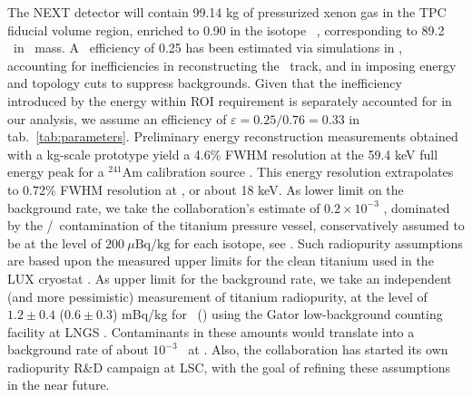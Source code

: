 The NEXT detector will contain 99.14 kg of pressurized xenon gas in the TPC fiducial volume region, enriched to 0.90 in the isotope \XE\ \cite{NEXT:2011eyk}, corresponding to 89.2 \kgbb\ in \bb\ mass. A \bbonu\ efficiency of 0.25 has been estimated via simulations in \cite{NEXT:2011eyk}, accounting for inefficiencies in reconstructing the \bb\ track, and in imposing energy and topology cuts to suppress backgrounds. Given that the inefficiency introduced by the energy within ROI requirement is separately accounted for in our analysis, we assume an efficiency of $\varepsilon =0.25/0.76=0.33$ in tab.~\ref{tab:parameters}. Preliminary energy reconstruction measurements obtained with a kg-scale prototype yield a 4.6\% FWHM resolution at the 59.4 keV full energy peak for a $^{241}$Am calibration source \cite{NEXT:2011eyk}. This energy resolution extrapolates to 0.72\% FWHM resolution at \Qbb, or about 18 keV. As lower limit on the background rate, we take the collaboration's estimate of $0.2\times 10^{-3}$ \ckkbby, dominated by the \URANIUM/\THORIUM\ contamination of the titanium pressure vessel, conservatively assumed to be at the level of $200\ \mu\text{Bq/kg}$ for each isotope, see \cite{NEXT:2011eyk}. Such radiopurity assumptions are based upon the measured upper limits for the clean titanium used in the LUX cryostat \cite{Hall:2010zz}. As upper limit for the background rate, we take an independent (and more pessimistic) measurement of titanium radiopurity, at the level of $1.2\pm 0.4$ ($0.6\pm 0.3$) mBq/kg for \URANIUM\ (\THORIUM) using the Gator low-background counting facility at LNGS \cite{Baudis:2012bc,Baudis:2011am}. Contaminants in these amounts would translate into a background rate of about $10^{-3}$ \ckkbby\ at \Qbb. Also, the collaboration has started its own radiopurity R\&D campaign at LSC, with the goal of refining these assumptions in the near future.

